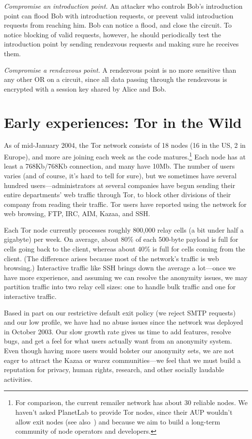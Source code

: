 \documentclass[twocolumn]{article}
\begin{document}
\emph{Compromise an introduction point.} An attacker who controls
Bob's introduction point can flood Bob with
introduction requests, or prevent valid introduction requests from
reaching him. Bob can notice a flood, and close the circuit.  To notice
blocking of valid requests, however, he should periodically test the
introduction point by sending rendezvous requests and making
sure he receives them.

\emph{Compromise a rendezvous point.}  A rendezvous
point is no more sensitive than any other OR on
a circuit, since all data passing through the rendezvous is encrypted
with a session key shared by Alice and Bob.

\section{Early experiences: Tor in the Wild}
\label{sec:in-the-wild}

As of mid-January 2004, the Tor network consists of 18 nodes
(16 in the US, 2 in Europe), and more are joining each week as the code
matures.\footnote{For comparison, the current remailer network
has about 30 reliable nodes. We haven't asked PlanetLab to provide
Tor nodes, since their AUP wouldn't allow exit nodes (see
also~\cite{darkside}) and because we aim to build a long-term community of
node operators and developers.} Each node has at least a 768Kb/768Kb
connection, and
many have 10Mb. The number of users varies (and of course, it's hard to
tell for sure), but we sometimes have several hundred users---administrators at
several companies have begun sending their entire departments' web
traffic through Tor, to block other divisions of
their company from reading their traffic. Tor users have reported using
the network for web browsing, FTP, IRC, AIM, Kazaa, and SSH.

Each Tor node currently processes roughly 800,000 relay
cells (a bit under half a gigabyte) per week. On average, about 80\%
of each 500-byte payload is full for cells going back to the client,
whereas about 40\% is full for cells coming from the client. (The difference
arises because most of the network's traffic is web browsing.) Interactive
traffic like SSH brings down the average a lot---once we have more
experience, and assuming we can resolve the anonymity issues, we may
partition traffic into two relay cell sizes: one to handle
bulk traffic and one for interactive traffic.

Based in part on our restrictive default exit policy (we
reject SMTP requests) and our low profile, we have had no abuse
issues since the network was deployed in October
2003. Our slow growth rate gives us time to add features,
resolve bugs, and get a feel for what users actually want from an
anonymity system.  Even though having more users would bolster our
anonymity sets, we are not eager to attract the Kazaa or warez
communities---we feel that we must build a reputation for privacy, human
rights, research, and other socially laudable activities.
\end{document}
